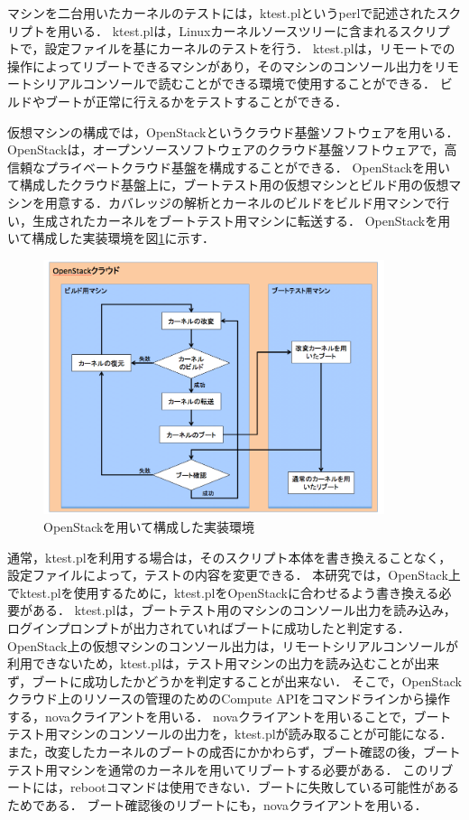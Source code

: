 \documentclass[graduation-thesis]{mlarticle}
\begin{document}
マシンを二台用いたカーネルのテストには，ktest.plというperlで記述されたスクリプトを用いる．
ktest.plは，Linuxカーネルソースツリーに含まれるスクリプトで，設定ファイルを基にカーネルのテストを行う．
ktest.plは，リモートでの操作によってリブートできるマシンがあり，そのマシンのコンソール出力をリモートシリアルコンソールで読むことができる環境で使用することができる．
ビルドやブートが正常に行えるかをテストすることができる．

仮想マシンの構成では，OpenStackというクラウド基盤ソフトウェアを用いる．
OpenStackは，オープンソースソフトウェアのクラウド基盤ソフトウェアで，高信頼なプライベートクラウド基盤を構成することができる．
OpenStackを用いて構成したクラウド基盤上に，ブートテスト用の仮想マシンとビルド用の仮想マシンを用意する．カバレッジの解析とカーネルのビルドをビルド用マシンで行い，生成されたカーネルをブートテスト用マシンに転送する．
OpenStackを用いて構成した実装環境を図\ref{fig:openstackenv}に示す．

\begin{figure}[H]
  \begin{center}
    \includegraphics[width=10.0cm]{images/openstackenv.png}
    \caption{OpenStackを用いて構成した実装環境}
    \label{fig:openstackenv}
  \end{center}
\end{figure}

通常，ktest.plを利用する場合は，そのスクリプト本体を書き換えることなく，設定ファイルによって，テストの内容を変更できる．
本研究では，OpenStack上でktest.plを使用するために，ktest.plをOpenStackに合わせるよう書き換える必要がある．
ktest.plは，ブートテスト用のマシンのコンソール出力を読み込み，ログインプロンプトが出力されていればブートに成功したと判定する．
OpenStack上の仮想マシンのコンソール出力は，リモートシリアルコンソールが利用できないため，ktest.plは，テスト用マシンの出力を読み込むことが出来ず，ブートに成功したかどうかを判定することが出来ない．
そこで，OpenStackクラウド上のリソースの管理のためのCompute APIをコマンドラインから操作する，novaクライアントを用いる．
novaクライアントを用いることで，ブートテスト用マシンのコンソールの出力を，ktest.plが読み取ることが可能になる．
また，改変したカーネルのブートの成否にかかわらず，ブート確認の後，ブートテスト用マシンを通常のカーネルを用いてリブートする必要がある．
このリブートには，rebootコマンドは使用できない．ブートに失敗している可能性があるためである．
ブート確認後のリブートにも，novaクライアントを用いる．
\end{document}
